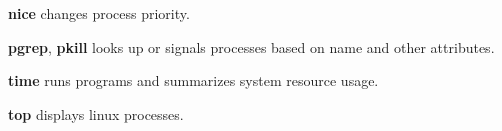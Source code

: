 \begin{enumx}
	\item [\cmd] \textbf{nice} changes process priority.
\end{enumx}

\begin{enumx}
	\item [\cmd] \textbf{pgrep}, \textbf{pkill} looks up or signals 
processes based on name and other attributes.
\end{enumx}

\begin{enumx}
	\item [\cmd] \textbf{time} runs programs and summarizes system resource usage. 
\end{enumx}

\begin{enumx}
	\item [\cmd] \textbf{top} displays linux processes.
\end{enumx}

